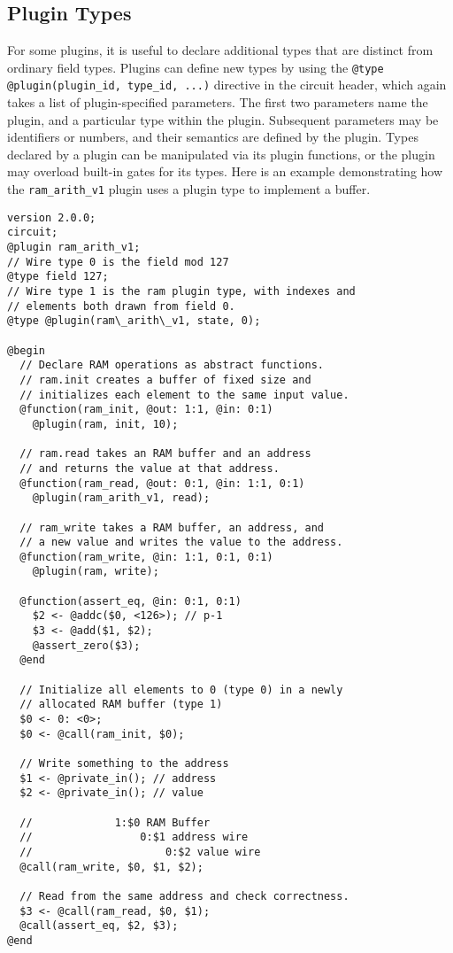 \subsection{Plugin Types}
%
For some plugins, it is useful to declare additional types that are distinct from ordinary field types.
Plugins can define new types by using the 
\texttt{@type @plugin(plugin\_id, type\_id, ...)} directive in the circuit header, which again takes a list of plugin-specified parameters. 
The first two parameters name the plugin, and a particular type within the plugin.
Subsequent parameters may be identifiers or numbers, and their semantics are defined by the plugin.
Types declared by a plugin can be manipulated via its plugin functions, or the plugin may overload built-in gates for its types.
Here is an example demonstrating how the \texttt{ram\_arith\_v1} plugin uses a plugin type to implement a buffer.

\begin{lstlisting}[language=ir]
version 2.0.0;
circuit;
@plugin ram_arith_v1;
// Wire type 0 is the field mod 127
@type field 127;
// Wire type 1 is the ram plugin type, with indexes and
// elements both drawn from field 0.
@type @plugin(ram\_arith\_v1, state, 0);

@begin
  // Declare RAM operations as abstract functions.
  // ram.init creates a buffer of fixed size and
  // initializes each element to the same input value.
  @function(ram_init, @out: 1:1, @in: 0:1) 
    @plugin(ram, init, 10);

  // ram.read takes an RAM buffer and an address
  // and returns the value at that address.
  @function(ram_read, @out: 0:1, @in: 1:1, 0:1)
    @plugin(ram_arith_v1, read);

  // ram_write takes a RAM buffer, an address, and
  // a new value and writes the value to the address.
  @function(ram_write, @in: 1:1, 0:1, 0:1)
    @plugin(ram, write);

  @function(assert_eq, @in: 0:1, 0:1)
    $2 <- @addc($0, <126>); // p-1
    $3 <- @add($1, $2);
    @assert_zero($3);
  @end

  // Initialize all elements to 0 (type 0) in a newly
  // allocated RAM buffer (type 1)
  $0 <- 0: <0>;
  $0 <- @call(ram_init, $0);

  // Write something to the address
  $1 <- @private_in(); // address
  $2 <- @private_in(); // value

  //             1:$0 RAM Buffer
  //                 0:$1 address wire
  //                     0:$2 value wire
  @call(ram_write, $0, $1, $2);

  // Read from the same address and check correctness.
  $3 <- @call(ram_read, $0, $1);
  @call(assert_eq, $2, $3);
@end
\end{lstlisting}

